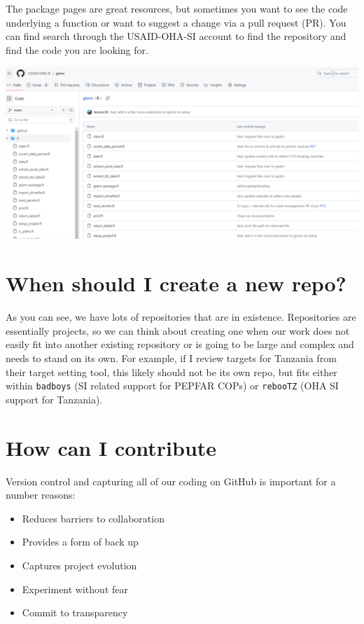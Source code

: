 \documentclass[
  letterpaper,
  DIV=11,
  numbers=noendperiod]{scrreprt}
\providecommand{\tightlist}{%
  \setlength{\itemsep}{0pt}\setlength{\parskip}{0pt}}\usepackage{longtable,booktabs,array}
\begin{document}
The package pages are great resources, but sometimes you want to see the
code underlying a function or want to suggest a change via a pull
request (PR). You can find search through the USAID-OHA-SI account to
find the repository and find the code you are looking for.

\includegraphics{./images/image38 - glamr code.png}

\hypertarget{when-should-i-create-a-new-repo}{%
\section{When should I create a new
repo?}\label{when-should-i-create-a-new-repo}}

As you can see, we have lots of repositories that are in existence.
Repositories are essentially projects, so we can think about creating
one when our work does not easily fit into another existing repository
or is going to be large and complex and needs to stand on its own. For
example, if I review targets for Tanzania from their target setting
tool, this likely should not be its own repo, but fits either within
\texttt{badboys} (SI related support for PEPFAR COPs) or
\texttt{rebooTZ} (OHA SI support for Tanzania).

\hypertarget{how-can-i-contribute}{%
\section{How can I contribute}\label{how-can-i-contribute}}

Version control and capturing all of our coding on GitHub is important
for a number reasons:

\begin{itemize}
\tightlist
\item
  Reduces barriers to collaboration
\item
  Provides a form of back up
\item
  Captures project evolution
\item
  Experiment without fear
\item
  Commit to transparency
\end{itemize}
\end{document}

